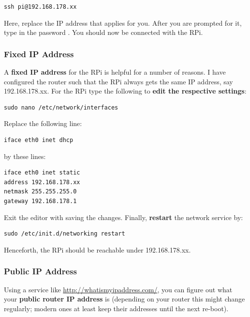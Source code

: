 \documentclass[letterpaper,10pt,english]{sphinxmanual}
\begin{document}
\begin{Verbatim}[commandchars=\\\{\}]
ssh pi@192.168.178.xx
\end{Verbatim}

Here, replace the IP address that applies for you. After you are prompted for it, type in the password . You should now be connected with the RPi.


\subsubsection{Fixed IP Address}
\label{00_basic_config:fixed-ip-address}\label{00_basic_config:fixip}
A \textbf{fixed IP address} for the RPi is helpful for a number of reasons. I have configured the router such that the RPi always gets the same IP address, say 192.168.178.xx. For the RPi type the following to \textbf{edit the respective settings}:

\begin{Verbatim}[commandchars=\\\{\}]
sudo nano /etc/network/interfaces
\end{Verbatim}

Replace the following line:

\begin{Verbatim}[commandchars=\\\{\}]
iface eth0 inet dhcp
\end{Verbatim}

by these lines:

\begin{Verbatim}[commandchars=\\\{\}]
iface eth0 inet static
address 192.168.178.xx
netmask 255.255.255.0
gateway 192.168.178.1
\end{Verbatim}

Exit the editor with  saving the changes. Finally, \textbf{restart} the network service by:

\begin{Verbatim}[commandchars=\\\{\}]
sudo /etc/init.d/networking restart
\end{Verbatim}

Henceforth, the RPi should be reachable under 192.168.178.xx.


\subsubsection{Public IP Address}
\label{00_basic_config:public-ip-address}
Using a service like \href{http://whatismyipaddress.com/}{http://whatismyipaddress.com/}, you can figure out what your \textbf{public router IP address} is (depending on your router this might change regularly; modern ones at least keep their addresses until the next re-boot).
\end{document}

